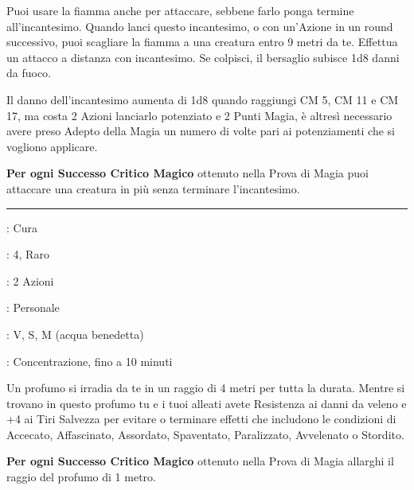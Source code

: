 \begin{multicols}{2}
Puoi usare la fiamma anche per attaccare, sebbene farlo ponga termine all'incantesimo. Quando lanci questo incantesimo, o con un'Azione in un round successivo, puoi scagliare la fiamma a una creatura entro 9 metri da te. Effettua un attacco a distanza con incantesimo. Se colpisci, il bersaglio subisce 1d8 danni da fuoco.

Il danno dell'incantesimo aumenta di 1d8 quando raggiungi CM 5, CM 11 e CM 17, ma costa 2 Azioni lanciarlo potenziato e 2 Punti Magia, è altresì necessario avere preso Adepto della Magia un numero di volte pari ai potenziamenti che si vogliono applicare.

\textbf{Per ogni Successo Critico Magico} ottenuto nella Prova di Magia puoi attaccare una creatura in più senza terminare l'incantesimo.

\smallskip\noindent\rule{\linewidth}{2pt} \hypertarget{Profumo di Atherim}{}\smallskip{}\label{Aura of Purity}
\noindent
\begin{description}[noitemsep, topsep=0pt, parsep=0pt, partopsep=0pt, leftmargin=0cm, labelwidth=2.8cm]
	\item[\textbf{Lista di Magia}] : Cura
	\item[\textbf{Livello}] : 4, Raro
	\item[\textbf{T. di Lancio}] : 2 Azioni
	\item[\textbf{Gittata}] : Personale
	\item[\textbf{Componenti}] : V, S, M (acqua benedetta)
	\item[\textbf{Durata}] : Concentrazione, fino a 10 minuti
\end{description}

Un profumo si irradia da te in un raggio di 4 metri per tutta la durata. Mentre si trovano in questo profumo tu e i tuoi alleati avete Resistenza ai danni da veleno e +4 ai Tiri Salvezza per evitare o terminare effetti che includono le condizioni di Accecato, Affascinato, Assordato, Spaventato, Paralizzato, Avvelenato o Stordito.

\textbf{Per ogni Successo Critico Magico} ottenuto nella Prova di Magia allarghi il raggio del profumo di 1 metro.


\end{multicols}
